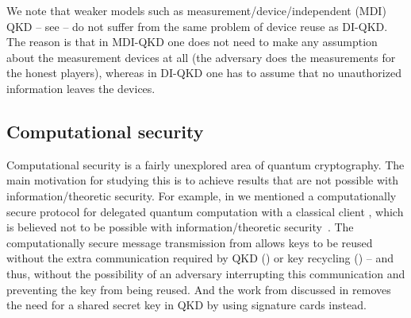 We note that weaker models such as measurement\-/device\-/independent
(MDI) QKD \--- see  \--- do not
suffer from the same problem of device reuse as DI-QKD. The reason is
that in MDI-QKD one does not need to make any assumption about the
measurement devices at all (the adversary does the measurements for
the honest players), whereas in DI-QKD one has to assume that no
unauthorized information leaves the devices.




\subsection{Computational security}
\label{sec:open.computational}

Computational security is a fairly unexplored area of quantum
cryptography. The main motivation for studying this is to achieve
results that are not possible with information\-/theoretic
security. For example, in  we mentioned a
computationally secure protocol for delegated quantum computation with
a classical client \cite{GV19}, which is believed not to be possible
with information\-/theoretic security~\cite{ACGK19}. The
computationally secure message transmission from
 allows keys to be reused without the extra
communication required by QKD () or key recycling
() \--- and thus, without the possibility of an
adversary interrupting this communication and preventing the key from
being reused. And the work from \textcite{Unr13} discussed in
 removes the need for a shared secret key in QKD
by using signature cards instead.

